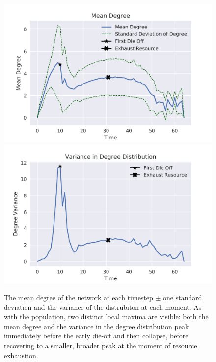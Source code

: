 \documentclass{paper}
\begin{document}
		\begin{figure}[h]
			\centering
			\includegraphics[scale=0.75]{mean_std_degree.png}
			\includegraphics[scale=0.75]{variance_degree.png}
			\caption{The mean degree of the network at each timestep $\pm$ one standard deviation and the variance of the distrubiton at each moment. As with the population, two distinct local maxima are visible: both the mean degree and the variance in the degree distribution peak immediately before the early die-off and then collapse, before recovering to a smaller, broader peak at the moment of resource exhaustion.}
			\label{mean-std}
		\end{figure}
		
\end{document}
